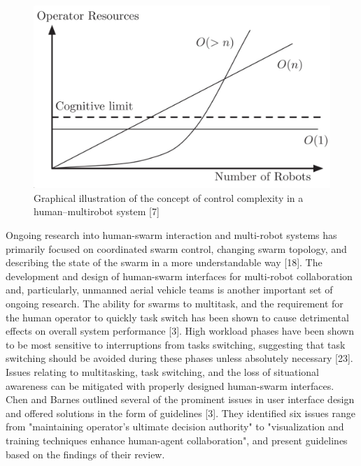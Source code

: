 \begin{figure}[b!]
    \begin{center}
        \includegraphics[width=0.8\linewidth]{figures/TradeStudy/figure2.png}
        \caption{Graphical illustration of the concept of control complexity in a human–multirobot system [7]}
    \end{center}
\end{figure}
Ongoing research into human-swarm interaction and multi-robot systems has primarily focused on coordinated swarm control, changing swarm topology, and describing the state of the swarm in a more understandable way [18]. The development and design of human-swarm interfaces for multi-robot collaboration and, particularly, unmanned aerial vehicle teams is another important set of ongoing research. The ability for swarms to multitask, and the requirement for the human operator to quickly task switch has been shown to cause detrimental effects on overall system performance [3]. High workload phases have been shown to be most sensitive to interruptions from tasks switching, suggesting that task switching should be avoided during these phases unless absolutely necessary [23]. Issues relating to multitasking, task switching, and the loss of situational awareness can be mitigated with properly designed human-swarm interfaces. Chen and Barnes outlined several of the prominent issues in user interface design and offered solutions in the form of guidelines [3]. They identified six issues range from "maintaining operator's ultimate decision authority" to "visualization and training techniques enhance human-agent collaboration", and present guidelines based on the findings of their review.


